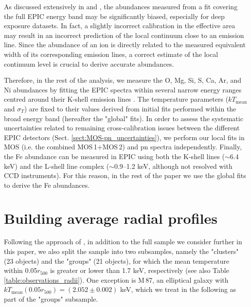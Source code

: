 \documentclass{aa}
\begin{document}
As discussed extensively in \citet{2015A&A...575A..37M} and \citet{2016A&A...592A.157M}, the abundances measured from a fit covering the full EPIC energy band may be significantly biased, especially for deep exposure datasets. In fact, a slightly incorrect calibration in the effective area may result in an incorrect prediction of the local continuum close to an emission line. Since the abundance of an ion is directly related to the measured equivalent width of its corresponding emission lines, a correct estimate of the local continuum level is crucial to derive accurate abundances.

Therefore, in the rest of the analysis, we measure the O, Mg, Si, S, Ca, Ar, and Ni abundances by fitting the EPIC spectra within several narrow energy ranges centred around their K-shell emission lines \citep[hereafter the "local" fits;][]{2016A&A...592A.157M}. The temperature parameters ($kT_\text{mean}$ and $\sigma_T$) are fixed to their values derived from initial fits performed within the broad energy band (hereafter the "global" fits). In order to assess the systematic uncertainties related to remaining cross-calibration issues between the different EPIC detectors (Sect. \ref{sect:MOS-pn_uncertainties}), we perform our local fits in MOS (i.e. the combined MOS\,1+MOS\,2) and pn spectra independently. Finally,  the Fe abundance can be measured in EPIC using both the K-shell lines ($\sim$6.4 keV) and the L-shell line complex ($\sim$0.9--1.2 keV, although not resolved with CCD instruments). For this reason, in the rest of the paper we use the global fits to derive the Fe abundances.
















\section{Building average radial profiles}\label{sect:building_radial_profiles}







Following the approach of \citet{2016A&A...592A.157M}, in addition to the full sample we consider further in this paper, we also split the sample into two subsamples, namely the "clusters" (23 objects) and the "groups" (21 objects), for which the mean temperature within 0.05$r_{500}$ is greater or lower than 1.7 keV, respectively (see also Table \ref{table:observations_radii}). One exception is M\,87, an elliptical galaxy with $kT_\text{mean}(0.05r_{500}) = (2.052 \pm 0.002)$ keV, which we treat in the following as part of the "groups" subsample.
\end{document}
